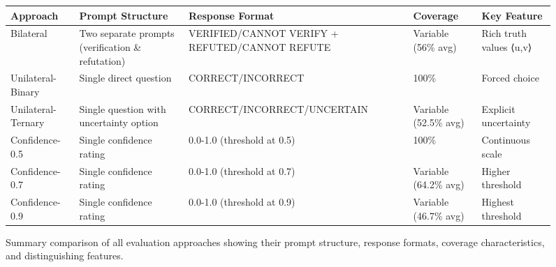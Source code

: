 \documentclass[11pt]{article}
\begin{document}

\begin{figure}[htbp]
\centering
\begin{tcolorbox}[colback=white,colframe=promptborder,title={Comparison of Evaluation Approaches}]
\small
\begin{tabular}{l|p{3cm}|p{3cm}|p{3cm}|p{2.5cm}}
\hline
\textbf{Approach} & \textbf{Prompt Structure} & \textbf{Response Format} & \textbf{Coverage} & \textbf{Key Feature} \\
\hline
Bilateral & Two separate prompts (verification \& refutation) & VERIFIED/CANNOT VERIFY + REFUTED/CANNOT REFUTE & Variable (56\% avg) & Rich truth values ⟨u,v⟩ \\[0.5em]
\hline
Unilateral-Binary & Single direct question & CORRECT/INCORRECT & 100\% & Forced choice \\[0.5em]
\hline
Unilateral-Ternary & Single question with uncertainty option & CORRECT/INCORRECT/UNCERTAIN & Variable (52.5\% avg) & Explicit uncertainty \\[0.5em]
\hline
Confidence-0.5 & Single confidence rating & 0.0-1.0 (threshold at 0.5) & 100\% & Continuous scale \\[0.5em]
\hline
Confidence-0.7 & Single confidence rating & 0.0-1.0 (threshold at 0.7) & Variable (64.2\% avg) & Higher threshold \\[0.5em]
\hline
Confidence-0.9 & Single confidence rating & 0.0-1.0 (threshold at 0.9) & Variable (46.7\% avg) & Highest threshold \\[0.5em]
\hline
\end{tabular}
\end{tcolorbox}
\caption{Summary comparison of all evaluation approaches showing their prompt structure, response formats, coverage characteristics, and distinguishing features.}
\label{fig:approach-comparison}
\end{figure}
\end{document}
